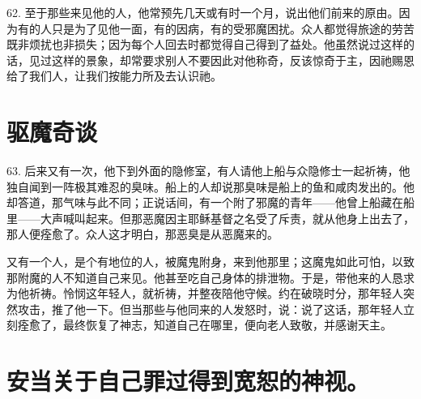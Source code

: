 62. 至于那些来见他的人，他常预先几天或有时一个月，说出他们前来的原由。因为有的人只是为了见他一面，有的因病，有的受邪魔困扰。众人都觉得旅途的劳苦既非烦扰也非损失；因为每个人回去时都觉得自己得到了益处。他虽然说过这样的话，见过这样的景象，却常要求别人不要因此对他称奇，反该惊奇于主，因祂赐恩给了我们人，让我们按能力所及去认识祂。\par


\section{驱魔奇谈}

63. 后来又有一次，他下到外面的隐修室，有人请他上船与众隐修士一起祈祷，他独自闻到一阵极其难忍的臭味。船上的人却说那臭味是船上的鱼和咸肉发出的。他却答道，那气味与此不同；正说话间，有一个附了邪魔的青年——他曾上船藏在船里——大声喊叫起来。但那恶魔因主耶稣基督之名受了斥责，就从他身上出去了，那人便痊愈了。众人这才明白，那恶臭是从恶魔来的。\par

又有一个人，是个有地位的人，被魔鬼附身，来到他那里；这魔鬼如此可怕，以致那附魔的人不知道自己来见。他甚至吃自己身体的排泄物。于是，带他来的人恳求为他祈祷。怜悯这年轻人，就祈祷，并整夜陪他守候。约在破晓时分，那年轻人突然攻击，推了他一下。但当那些与他同来的人发怒时，说：说了这话，那年轻人立刻痊愈了，最终恢复了神志，知道自己在哪里，便向老人致敬，并感谢天主。\par


\section{安当关于自己罪过得到宽恕的神视。}

